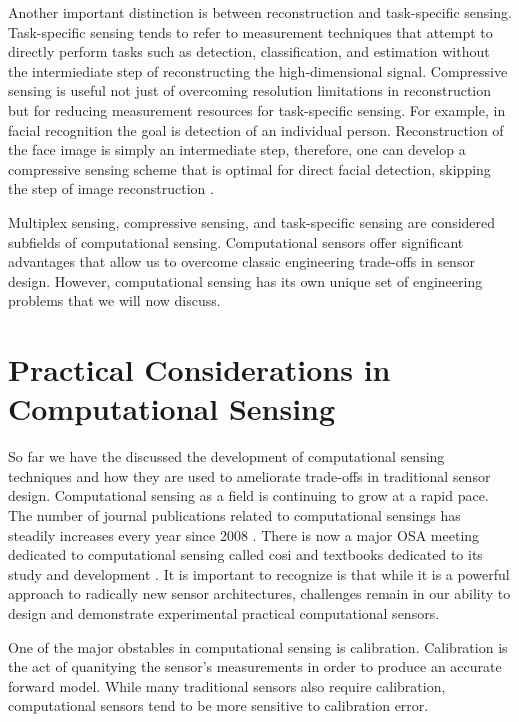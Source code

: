 Another important distinction is between reconstruction and task-specific sensing. Task-specific sensing tends to refer to measurement techniques that attempt to directly perform tasks such as detection, classification, and estimation without the intermiediate step of reconstructing the high-dimensional signal. Compressive sensing is useful not just of overcoming resolution limitations in reconstruction but for reducing measurement resources for task-specific sensing. For example, in facial recognition the goal is detection of an individual person. Reconstruction of the face image is simply an intermediate step, therefore, one can develop a compressive sensing scheme that is optimal for direct facial detection, skipping the step of image reconstruction \cite{pal2005face}. 

Multiplex sensing, compressive sensing, and task-specific sensing are considered subfields of computational sensing. Computational sensors offer significant advantages that allow us to overcome classic engineering trade-offs in sensor design. However, computational sensing has its own unique set of engineering problems that we will now discuss.

\section{Practical Considerations in Computational Sensing}

So far we have the discussed the development of computational sensing techniques and how they are used to ameliorate trade-offs in traditional sensor design. Computational sensing as a field is continuing to grow at a rapid pace. The number of journal publications related to computational sensings has steadily increases every year since 2008 \cite{stern2016hurdles}. There is now a major OSA meeting dedicated to computational sensing called \gls{cosi} \cite{cosi2016meetingwebsite} and textbooks dedicated to its study and development \cite{brady2009optical, foucart2013mathematical}. It is important to recognize is that while it is a powerful approach to radically new sensor architectures, challenges remain in our ability to design and demonstrate experimental practical computational sensors.

One of the major obstables in computational sensing is calibration. Calibration is the act of quanitying the sensor's measurements in order to produce an accurate forward model. While many traditional sensors also require calibration, computational sensors tend to be more sensitive to calibration error. 

